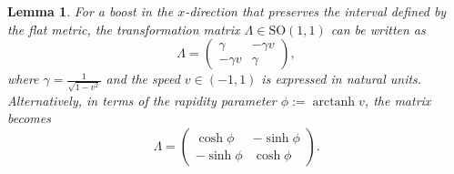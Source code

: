 \documentclass{amsart}
\newtheorem{lemma}[theorem]{Lemma}
\theoremstyle{remark}
\DeclareMathOperator{\arctanh}{arctanh}
\begin{document}
\begin{lemma}
  For a boost in the $x$-direction that preserves the interval defined by the flat metric, the transformation matrix $\Lambda\in\mathrm{SO}(1,1)$ can be written as
  \[
  \Lambda =
  \begin{pmatrix}
    \gamma & -\gamma v \\
    -\gamma v & \gamma
  \end{pmatrix},
  \]
  where $\gamma = \frac{1}{\sqrt{1 - v^2}}$ and the \emph{speed} $v \in (-1,1)$ is expressed in natural units. Alternatively, in terms of the \emph{rapidity} parameter $\phi := \arctanh v$, the matrix becomes
  \[
  \Lambda =
  \begin{pmatrix}
    \cosh \phi & -\sinh \phi \\
    -\sinh \phi & \cosh \phi
  \end{pmatrix}.
  \]
\end{lemma}
\end{document}
